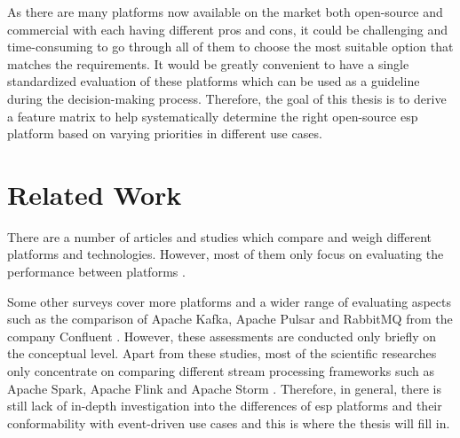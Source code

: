 As there are many platforms now available on the market both open-source and commercial with each having different pros and cons, it could be challenging and time-consuming to go through all of them to choose the most suitable option that matches the requirements. It would be greatly convenient to have a single standardized evaluation of these platforms which can be used as a guideline during the decision-making process. Therefore, the goal of this thesis is to derive a feature matrix to help systematically determine the right open-source \acrshort{esp} platform based on varying priorities in different use cases. 


\section{Related Work}

There are a number of articles and studies which compare and weigh different platforms and technologies. However, most of them only focus on evaluating the performance between platforms \cite{benchmarkkafkapulsarrabbitmq} \cite{benchmarkfull} \cite{benchmarkkafkapulsar}.

Some other surveys cover more platforms and a wider range of evaluating aspects such as the comparison of Apache Kafka, Apache Pulsar and RabbitMQ from the company Confluent \cite{overallcomparekafka}. However, these assessments are conducted only briefly on the conceptual level. Apart from these studies, most of the scientific researches only concentrate on comparing different stream processing frameworks such as Apache Spark, Apache Flink and Apache Storm \cite{karimov2018benchmarking} \cite{isah2019survey}. Therefore, in general, there is still lack of in-depth investigation into the differences of \acrshort{esp} platforms and their conformability with event-driven use cases and this is where the thesis will fill in.
 
